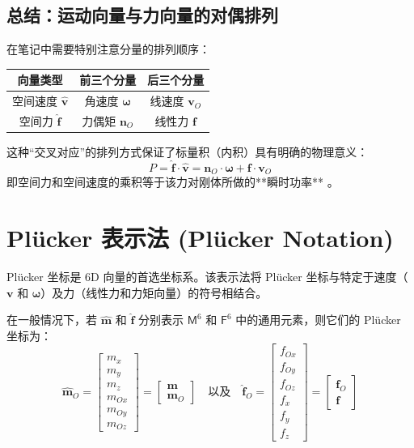 \subsection{总结：运动向量与力向量的对偶排列}
在笔记中需要特别注意分量的排列顺序：
\begin{table}[h]
\centering
\begin{tabular}{|c|c|c|}
\hline
\textbf{向量类型} & \textbf{前三个分量} & \textbf{后三个分量} \\ \hline
空间速度 $\hat{\bm{v}}$ & 角速度 $\bm{\omega}$ & 线速度 $\bm{v}_O$ \\ \hline
空间力 $\hat{\bm{f}}$ & 力偶矩 $\bm{n}_O$ & 线性力 $\bm{f}$ \\ \hline
\end{tabular}
\end{table}
这种“交叉对应”的排列方式保证了标量积（内积）具有明确的物理意义：
\begin{equation*}
    P = \hat{\bm{f}} \cdot \hat{\bm{v}} = \bm{n}_O \cdot \bm{\omega} + \bm{f} \cdot \bm{v}_O
\end{equation*}
即空间力和空间速度的乘积等于该力对刚体所做的**瞬时功率** 。

\section*{Plücker 表示法 (Plücker Notation)}

Plücker 坐标是 6D 向量的首选坐标系。该表示法将 Plücker 坐标与特定于速度（$\bm{v}$ 和 $\bm{\omega}$）及力（线性力和力矩向量）的符号相结合。

在一般情况下，若 $\hat{\bm{m}}$ 和 $\hat{\bm{f}}$ 分别表示 $\mathsf{M}^6$ 和 $\mathsf{F}^6$ 中的通用元素，则它们的 Plücker 坐标为：
\begin{equation}
\hat{\bm{m}}_O = \begin{bmatrix} m_x \\ m_y \\ m_z \\ m_{Ox} \\ m_{Oy} \\ m_{Oz} \end{bmatrix} = \begin{bmatrix} \bm{m} \\ \bm{m}_O \end{bmatrix} \quad \text{以及} \quad \hat{\bm{f}}_O = \begin{bmatrix} f_{Ox} \\ f_{Oy} \\ f_{Oz} \\ f_x \\ f_y \\ f_z \end{bmatrix} = \begin{bmatrix} \bm{f}_O \\ \bm{f} \end{bmatrix}
\end{equation}

